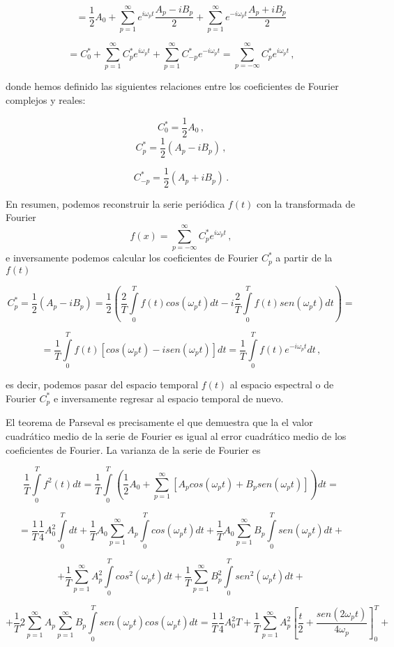 \documentclass[
]{agujournal2019}
\begin{document}
\[=\frac{1}{2}A_0+\sum\limits^\infty_{p=1} e^{i\omega_p t}\frac{A_p-iB_p}{2} + 
 \sum\limits^\infty_{p=1} e^{-i\omega_p t}\frac{A_p+iB_p}{2} \]

\[=C^*_0 + \sum\limits^\infty_{p=1}C^*_pe^{i\omega_p t} + \sum\limits^\infty_{p=1}C^*_{-p} e^{-i\omega_p t}=
\sum\limits^\infty_{p=-\infty} C^*_p e^{i\omega_p t}\,,\]

donde hemos definido las siguientes relaciones entre los coeficientes de
Fourier complejos y reales:

\[C^*_0=\frac{1}{2}A_0\,,\] \[C^*_p=\frac{1}{2}(A_p-iB_p)\,,\]

\[C^*_{-p}=\frac{1}{2}(A_p+iB_p)\,.\]

En resumen, podemos reconstruir la serie periódica \(f(t)\) con la
transformada de Fourier
\[f(x)=\sum\limits^\infty_{p=-\infty} C^*_p e^{i\omega_p t}\,,\] e
inversamente podemos calcular los coeficientes de Fourier \(C^*_p\) a
partir de la \(f(t)\)

\[C^*_p=\frac{1}{2}(A_p-iB_p)=\frac{1}{2}\left(\frac{2}{T}\int\limits_0^{T} f(t) cos(\omega_p t) dt -
                                             i \frac{2}{T}\int\limits_0^{T} f(t) sen(\omega_p t) dt \right)=\]

\[=\frac{1}{T}\int\limits_0^{T} f(t) [cos(\omega_p t) - isen(\omega_p t) ]dt = 
\frac{1}{T}\int\limits_0^{T} f(t) e^{-i \omega_p t} dt\,,\]

es decir, podemos pasar del espacio temporal \(f(t)\) al espacio
espectral o de Fourier \(C^*_p\) e inversamente regresar al espacio
temporal de nuevo.

El teorema de Parseval es precisamente el que demuestra que la el valor
cuadrático medio de la serie de Fourier es igual al error cuadrático
medio de los coeficientes de Fourier. La varianza de la serie de Fourier
es

\[\frac{1}{T}\int\limits^{T}_0 f^2(t) dt=\frac{1}{T}\int\limits^{T}_0
\left(\frac{1}{2}A_0 +\sum\limits^\infty_{p=1}[A_p cos(\omega_p t) + B_p sen(\omega_p t)]\right) dt=\]

\[=\frac{1}{T}\frac{1}{4} A^2_0 \int\limits^{T}_0 dt + \frac{1}{T}A_0 \sum\limits^\infty_{p=1} A_p \int\limits^{T}_0 cos(\omega_p t)dt + \frac{1}{T}A_0\sum\limits^\infty_{p=1}B_p \int\limits^{T}_0 sen(\omega_p t)dt +\]

\[+\frac{1}{T}\sum\limits^\infty_{p=1}A^2_p \int\limits^{T}_0 cos^2(\omega_p t)dt +
\frac{1}{T}\sum\limits^\infty_{p=1}B^2_p \int\limits^{T}_0 sen^2(\omega_p t)dt+\]

\[+\frac{1}{T}2\sum\limits^\infty_{p=1}A_p \sum\limits^\infty_{p=1}B_p\int\limits^{T}_0 sen(\omega_p t)cos(\omega_p t)dt=
\frac{1}{T}\frac{1}{4}A^2_0 T + \frac{1}{T}\sum\limits^\infty_{p=1}A^2_p\left[ \frac{t}{2} 
+ \frac{sen(2\omega_p t)}{4\omega_p}\right]^T_0+\]
\end{document}
